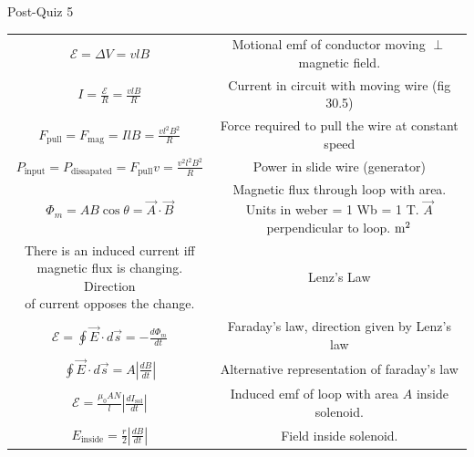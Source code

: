 \documentclass{article}
\begin{document}
\begin{center}
\begin{section}{Post-Quiz 5}
\begin{tabular}{|c|c|}
		 $\mathcal E = \Delta V = v l B$                                               & Motional emf of conductor moving $\perp$ magnetic field. \\

		 $I = \frac{\mathcal E}{R} = \frac{vlB}{R}$                                    & Current in circuit with moving wire (fig 30.5)           \\

		 $F_\text{pull} = F_\text{mag} = IlB = \frac{vl^2B^2}{R}$                      & Force required to pull the wire at constant speed        \\

		 $P_\text{input} = P_\text{dissapated} = F_\text{pull}v = \frac{v^2l^2B^2}{R}$ & Power in slide wire (generator)                          \\

		 $\Phi_m = AB \cos \theta = \vec A \cdot \vec B $                              & \makecell{Magnetic flux through loop with area. Units in \\
		 weber = 1 Wb = 1 T. $\vec A$ perpendicular to loop. $\text m^2$}                                                                         \\

		 \makecell{There is an induced current iff                                                                                                \\
		 magnetic flux is changing. Direction                                                                                                     \\
		 of current opposes the change.}                                               & Lenz's Law                                               \\

		 $\mathcal E = \oint \vec E \cdot d \vec s =  -\frac{d \Phi_m}{dt} $           & Faraday's law, direction given by Lenz's law             \\

		 $\oint \vec E \cdot d \vec s = A | \frac{dB}{dt} | $                          & Alternative representation of faraday's law              \\

		 $\mathcal E = \frac{\mu_0 A N}{l} | \frac{d I_\text{sol}}{dt} | $             & Induced emf of loop with area $A$ inside solenoid.       \\

		 $E_\text{inside} = \frac{r}{2} | \frac{dB}{dt} |$                             & Field inside solenoid.                                   \\


\end{tabular}
\end{section}
\end{center}
\end{document}
